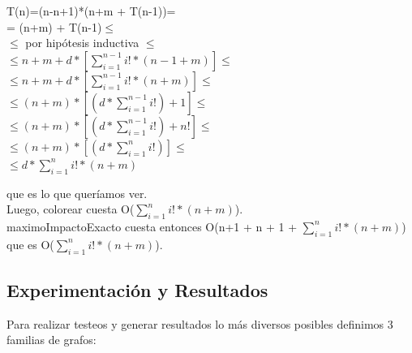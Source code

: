 \begin{center}
T(n)=(n-n+1)*(n+m + T(n-1))=\\

= (n+m) + T(n-1)$\leq$\\

$\leq$ por hipótesis inductiva $\leq$\\

$\leq n+m + d * [\sum_{i=1}^{n-1} i! * (n-1+m)] \leq $\\

$\leq n+m + d * [\sum_{i=1}^{n-1} i! * (n+m)] \leq$ \\

$\leq (n+m) *[ (d* \sum_{i=1}^{n-1} i!) + 1] \leq$ \\

$\leq (n+m) *[ (d* \sum_{i=1}^{n-1} i!) + n!] \leq$ \\

$\leq (n+m) *[ (d* \sum_{i=1}^{n} i!)] \leq$\\

$\leq  d* \sum_{i=1}^{n} i!*(n+m)$\\

\end{center}

\indent que es lo que queríamos ver.\\

\indent Luego, colorear cuesta O($\sum_{i=1}^{n} i! * (n+m) $).\\

\indent maximoImpactoExacto cuesta entonces O(n+1 + n + 1 + $\sum_{i=1}^{n} i! * (n+m) $) que es O($\sum_{i=1}^{n} i! * (n+m) $).\\

\subsection{Experimentación y Resultados}

\quad Para realizar testeos y generar resultados lo más diversos posibles definimos 3 familias de grafos:

